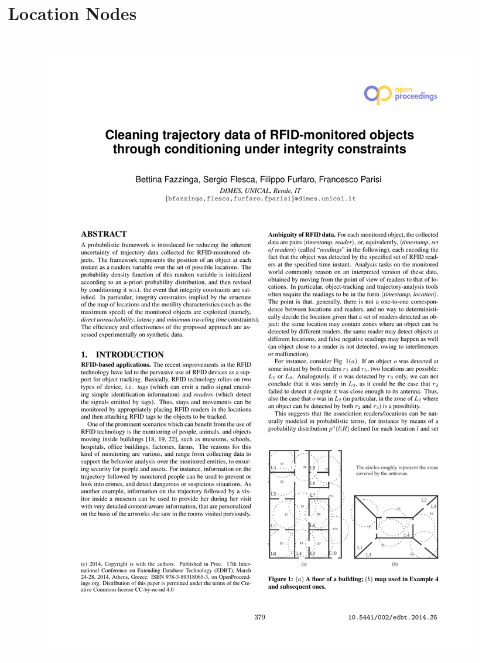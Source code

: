 
\begin{frame}
\frametitle{Location Nodes}

\begin{columns}

  \begin{figure}[tb]
    \includegraphics[width=\columnwidth]{figures/3-4/3-4-2.pdf}
  \end{figure}



\end{columns}
\end{frame}
